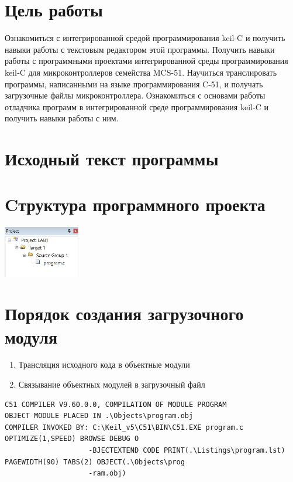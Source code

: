 \documentclass[ru, listings]{labreport}
\begin{document}
\maketitlepage

\section*{Цель работы}

Ознакомиться с интегрированной средой программирования keil-C и получить навыки работы
с текстовым редактором этой программы. Получить навыки работы с программными проектами
интегрированной среды программирования keil-C для микроконтроллеров семейства MCS-51.
Научиться транслировать программы, написанными на языке программирования C-51,
и получать загрузочные файлы микроконтроллера.
Ознакомиться с основами работы отладчика программ в
интегрированной среде программирования keil-C и получить навыки работы с ним.

\section*{Исходный текст программы}



\section*{Cтруктура программного проекта}

\includegraphics[width=0.25\textwidth]{project-structure}

\section*{Порядок создания загрузочного модуля}

\begin{enumerate}
\item Трансляция исходного кода в объектные модули
\item Связывание объектных модулей в загрузочный файл
\end{enumerate}

\begin{scriptsize}
\begin{verbatim}
C51 COMPILER V9.60.0.0, COMPILATION OF MODULE PROGRAM
OBJECT MODULE PLACED IN .\Objects\program.obj
COMPILER INVOKED BY: C:\Keil_v5\C51\BIN\C51.EXE program.c OPTIMIZE(1,SPEED) BROWSE DEBUG O
                    -BJECTEXTEND CODE PRINT(.\Listings\program.lst) PAGEWIDTH(90) TABS(2) OBJECT(.\Objects\prog
                    -ram.obj)
\end{verbatim}
\end{scriptsize}
\end{document}
